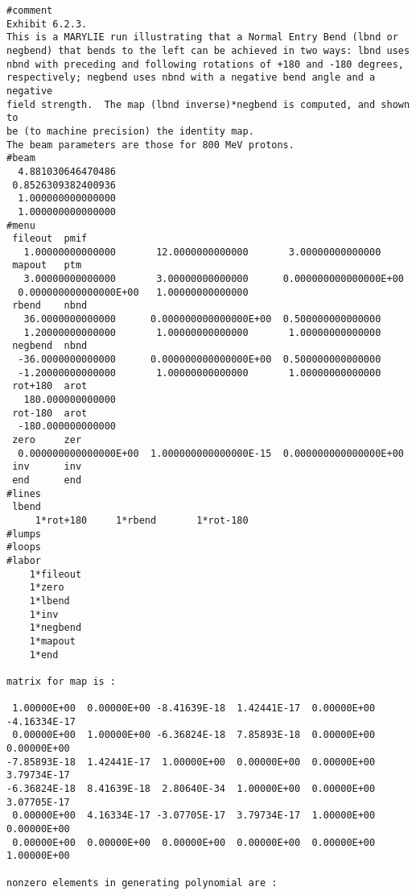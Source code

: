 \newpage
\begin{footnotesize}
\begin{verbatim}
#comment
Exhibit 6.2.3.
This is a MARYLIE run illustrating that a Normal Entry Bend (lbnd or
negbend) that bends to the left can be achieved in two ways: lbnd uses
nbnd with preceding and following rotations of +180 and -180 degrees,
respectively; negbend uses nbnd with a negative bend angle and a negative
field strength.  The map (lbnd inverse)*negbend is computed, and shown to
be (to machine precision) the identity map.
The beam parameters are those for 800 MeV protons.
#beam
  4.881030646470486
 0.8526309382400936
  1.000000000000000
  1.000000000000000
#menu
 fileout  pmif
   1.00000000000000       12.0000000000000       3.00000000000000
 mapout   ptm
   3.00000000000000       3.00000000000000      0.000000000000000E+00
  0.000000000000000E+00   1.00000000000000
 rbend    nbnd
   36.0000000000000      0.000000000000000E+00  0.500000000000000
   1.20000000000000       1.00000000000000       1.00000000000000
 negbend  nbnd
  -36.0000000000000      0.000000000000000E+00  0.500000000000000
  -1.20000000000000       1.00000000000000       1.00000000000000
 rot+180  arot
   180.000000000000
 rot-180  arot
  -180.000000000000
 zero     zer
  0.000000000000000E+00  1.000000000000000E-15  0.000000000000000E+00
 inv      inv
 end      end
#lines
 lbend
     1*rot+180     1*rbend       1*rot-180
#lumps
#loops
#labor
    1*fileout
    1*zero
    1*lbend
    1*inv
    1*negbend
    1*mapout
    1*end

matrix for map is :

 1.00000E+00  0.00000E+00 -8.41639E-18  1.42441E-17  0.00000E+00 -4.16334E-17
 0.00000E+00  1.00000E+00 -6.36824E-18  7.85893E-18  0.00000E+00  0.00000E+00
-7.85893E-18  1.42441E-17  1.00000E+00  0.00000E+00  0.00000E+00  3.79734E-17
-6.36824E-18  8.41639E-18  2.80640E-34  1.00000E+00  0.00000E+00  3.07705E-17
 0.00000E+00  4.16334E-17 -3.07705E-17  3.79734E-17  1.00000E+00  0.00000E+00
 0.00000E+00  0.00000E+00  0.00000E+00  0.00000E+00  0.00000E+00  1.00000E+00

nonzero elements in generating polynomial are :
\end{verbatim}
\end{footnotesize}

